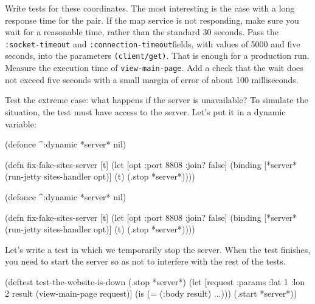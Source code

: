
Write tests for these coordinates. The most interesting is the case with a long response time for the  pair. If the map service is not responding, make sure you wait for a reasonable time, rather than the standard 30 seconds. Pass the \verb|:socket-timeout| and \verb|:connection-timeout|fields, with values of 5000 and five seconds, into the parameters \verb|(client/get)|. That is enough for a production run. Measure the execution time of \verb|view-main-page|. Add a check that the wait does not exceed five seconds with a small margin of error of about 100 milliseconds.

Test the extreme case: what happens if the server is unavailable? To simulate the situation, the test must have access to the server. Let's put it in a dynamic variable:


\ifnarrow

\begin{english}
  \begin{clojure}
(defonce ^:dynamic *server* nil)

(defn fix-fake-sites-server [t]
  (let [opt {:port 8808 :join? false}]
    (binding [*server*
              (run-jetty
                sites-handler opt)]
      (t)
      (.stop *server*))))
  \end{clojure}
\end{english}

\else

\begin{english}
  \begin{clojure}
(defonce ^:dynamic *server* nil)

(defn fix-fake-sites-server [t]
  (let [opt {:port 8808 :join? false}]
    (binding [*server*
              (run-jetty sites-handler opt)]
      (t)
      (.stop *server*))))
  \end{clojure}
\end{english}

\fi

Let's write a test in which we temporarily stop the server. When the test finishes, you need to start the server so as not to interfere with the rest of the tests.

\begin{english}
  \begin{clojure}
(deftest test-the-website-is-down
  (.stop *server*)
  (let [request {:params {:lat 1 :lon 2}}
        result (view-main-page request)]
    (is (= (:body result) {...})))
  (.start *server*))
  \end{clojure}
\end{english}


